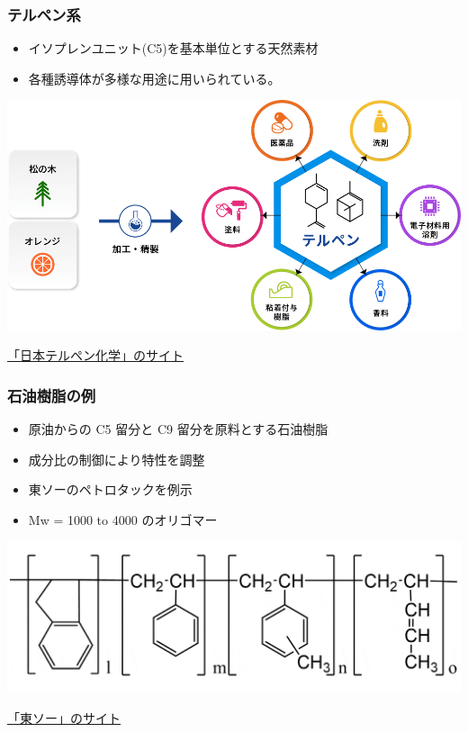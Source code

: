 \documentclass[12pt, dvipdfmx]{beamer}
\begin{document}
\begin{frame}
	\frametitle{テルペン系}
		\begin{itemize}
			\item イソプレンユニット(C5)を基本単位とする天然素材
			\item 各種誘導体が多様な用途に用いられている。
		\end{itemize}
		\centering
			\includegraphics[width=\textwidth]{tackifier_terpene.png}

		\href{https://www.nipponterpene.co.jp/about/}{「日本テルペン化学」のサイト}
\end{frame}

\begin{frame}
	\frametitle{石油樹脂の例}
	\begin{itemize}
		\item 原油からの C5 留分と C9 留分を原料とする石油樹脂
		\item 成分比の制御により特性を調整
		\item 東ソーのペトロタックを例示
		\item Mw = 1000 to 4000 のオリゴマー
	\end{itemize}
	
		\centering
			\includegraphics[width=\textwidth]{tackifier_petroleun_polymer.png}
	
			\href{https://www.tosoh.co.jp/product/polymer/c5_c9_type_petroleun_polymer_resins.html}{「東ソー」のサイト}
\end{frame}
\end{document}
